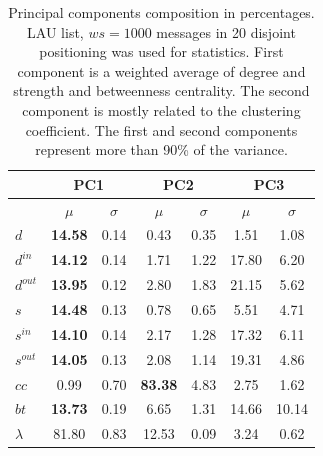 \documentclass[%
 aip,
 jmp,%
 amsmath,amssymb,
 reprint,%
]{revtex4-1}
\begin{document}
\begin{table}
  \centering
  \caption{Principal components composition in percentages. LAU list, $ws=1000$ messages in 20 disjoint positioning was used for statistics. First component is a weighted average of degree and strength and betweenness centrality. The second component is mostly related to the  clustering coefficient. The first and second components represent more than 90\% of the variance.}
  \begin{tabular}{|l|c|c| c|c| c|c|}\hline
 & \multicolumn{2}{c|}{PC1} & \multicolumn{2}{c|}{PC2} & \multicolumn{2}{c|}{PC3}  \\\hline
       & $\mu$ & $\sigma$ & $\mu$ & $\sigma$ & $\mu$ & $\sigma$  \\\hline
$d$       & {\bf 14.58} & 0.14 & 0.43  & 0.35 & 1.51  & 1.08 \\
$d^{in}$  & {\bf 14.12} & 0.14 & 1.71  & 1.22 & 17.80 & 6.20 \\
$d^{out}$ & {\bf 13.95} & 0.12 & 2.80  & 1.83 & 21.15 & 5.62 \\
$s$       & {\bf 14.48} & 0.13 & 0.78  & 0.65 & 5.51  & 4.71 \\ 
$s^{in}$  & {\bf 14.10} & 0.14 & 2.17  & 1.28 & 17.32 & 6.11 \\ 
$s^{out}$ & {\bf 14.05} & 0.13 & 2.08  & 1.14 & 19.31 & 4.86 \\ \hline
$cc$      & 0.99        & 0.70 & {\bf 83.38} & 4.83 & 2.75  & 1.62 \\ 
$bt$      & {\bf 13.73} & 0.19 & 6.65  & 1.31 & 14.66 & 10.14 \\ \hline
$\lambda$ & 81.80 & 0.83 & 12.53 & 0.09  & 3.24 & 0.62 \\ \hline
  \end{tabular}
  \label{compPCA}
\end{table}
\end{document}
